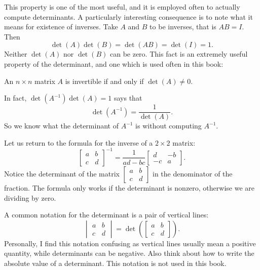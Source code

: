 \documentclass{ximera}
\begin{document}
This property is one of the most useful, and it is employed often to actually compute determinants.  A particularly interesting consequence is to note what it means for existence of inverses. Take $A$ and $B$ to be inverses, that is $AB=I$.  Then
\begin{equation*}
    \det(A)\det(B) = \det(AB) = \det(I) = 1 .
\end{equation*}
Neither $\det(A)$ nor $\det(B)$ can be zero. This fact is an extremely useful property of the determinant, and one which is used often in this book:

\begin{theorem}\label{thm:detInv}
    An $n \times n$ matrix $A$ is invertible if and only if $\det (A) \not= 0$.
\end{theorem}

In fact, $\det(A^{-1}) \det(A) = 1$ says that
\begin{equation*}
    \det(A^{-1}) = \frac{1}{\det(A)}.
\end{equation*}
So we know what the determinant of $A^{-1}$ is without computing $A^{-1}$.

Let us return to the formula for the inverse of a $2 \times 2$ matrix:
\begin{equation*}
    \begin{bmatrix}
        a & b \\
        c & d
    \end{bmatrix}^{-1}
    = \frac{1}{ad-bc}
    \begin{bmatrix}
        d & -b \\
        -c & a
    \end{bmatrix} .
\end{equation*}
Notice the determinant of the matrix $[\begin{smallmatrix}a&b\\c&d\end{smallmatrix}]$ in the denominator of the fraction. The formula only works if the determinant is nonzero, otherwise we are dividing by zero.

%


A common notation for the determinant is a pair of vertical lines:
\begin{equation*}
    \begin{vmatrix}
        a & b \\
        c & d
    \end{vmatrix}
    = \det 
    \left(
        \begin{bmatrix}
            a & b \\
            c & d
        \end{bmatrix}
    \right) .
\end{equation*}
Personally, I find this notation confusing as vertical lines usually mean a positive quantity, while determinants can be negative.  Also think about how to write the absolute value of a determinant. This notation is not used in this book.
\end{document}
